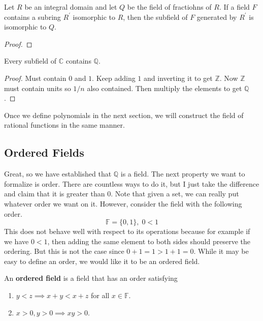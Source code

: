   \begin{corollary}
    Let $R$ be an integral domain and let $Q$ be the field of fractiohns of $R$. If a field $F$ contains a subring $R^\prime$ isomorphic to $R$, then the subfield of $F$ generated by $R^\prime$ is isomorphic to $Q$. 
  \end{corollary}
  \begin{proof}
    
  \end{proof}
  
  \begin{lemma}
    Every subfield of $\mathbb{C}$ contains $\mathbb{Q}$. 
  \end{lemma}
  \begin{proof}
    Must contain $0$ and $1$. Keep adding $1$ and inverting it to get $\mathbb{Z}$. Now $\mathbb{Z}$ must contain units so $1/n$ also contained. Then multiply the elements to get $\mathbb{Q}$. 
  \end{proof} 

  Once we define polynomials in the next section, we will construct the field of rational functions in the same manner. 

\subsection{Ordered Fields}

  Great, so we have established that $\mathbb{Q}$ is a field. The next property we want to formalize is order. There are countless ways to do it, but I just take the difference and claim that it is greater than $0$. Note that given a set, we can really put whatever order we want on it. However, consider the field with the following order. 
  \begin{equation}
    \mathbb{F} = \{0, 1\}, \; 0 < 1
  \end{equation} 
  This does not behave well with respect to its operations because for example if we have $0 < 1$, then adding the same element to both sides should preserve the ordering. But this is not the case since $0 + 1 = 1 > 1 + 1 = 0$. While it may be easy to define an order, we would like it to be an ordered field. 

  \begin{definition}
    An \textbf{ordered field} is a field that has an order satisfying 
    \begin{enumerate}
      \item $y < z \implies x + y < x + z$ for all $x \in \mathbb{F}$. 
      \item $x > 0, y > 0 \implies xy > 0$. 
    \end{enumerate}
  \end{definition}


